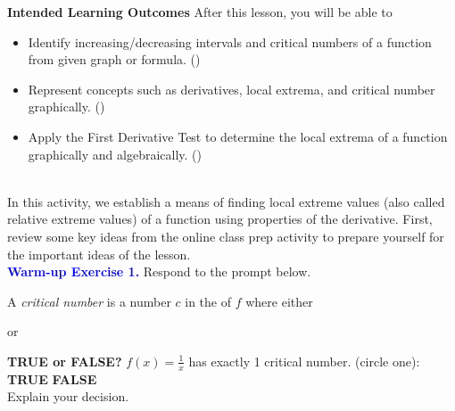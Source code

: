 \documentclass[10pt]{article}
\begin{document}
\pagestyle{otherpages}
\thispagestyle{firstpage}

\textbf{Intended Learning Outcomes}
After this lesson, you will be able to 

\begin{itemize}
    \item Identify increasing/decreasing intervals and critical numbers of a function from given graph or formula. ()
    \item Represent concepts such as derivatives, local extrema, and critical number graphically. ()
    \item Apply the First Derivative Test to determine the local extrema of a function graphically and algebraically. ()
\end{itemize}

\vspace{-0.5cm}

\hrulefill\\
In this activity, we establish a means of finding local extreme values (also called relative extreme values) of a function using properties of the derivative. First, review some key ideas from the online class prep activity to prepare yourself for the important ideas of the lesson.\\

{\bf \textcolor{blue}{Warm-up Exercise 1.}}  Respond to the prompt below.
%
    {
    A {\em critical number} is  a number $c$ in the  of $f$ where either
  \begin{center}  \quad\quad\quad or \quad\quad\quad {} \end{center}
    }
    
    {\bf TRUE or FALSE?} $\displaystyle f(x)=\frac1x$ has exactly 1 critical number. \hfill (circle one): \hfill {\bf TRUE} \hfill {\bf FALSE}\\ Explain your decision.
    
 
\end{document}
